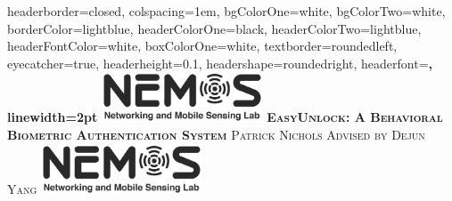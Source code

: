 \documentclass[landscape,a0paper,fontscale=0.285]{baposter} %
\begin{document}
\begin{poster}
{
headerborder=closed, %
colspacing=1em, %
bgColorOne=white, %
bgColorTwo=white, %
borderColor=lightblue, %
headerColorOne=black, %
headerColorTwo=lightblue, %
headerFontColor=white, %
boxColorOne=white, %
textborder=roundedleft, %
eyecatcher=true, %
headerheight=0.1\textheight, %
headershape=roundedright, %
headerfont=\Large\bf\textsc, %
linewidth=2pt %
}
%
{\includegraphics[height=4em]{NEMOS-logo.png}} %
{\bf\textsc{EasyUnlock: A Behavioral Biometric Authentication System}\vspace{0.5em}} %
    {\textsc{{ Patrick Nichols } \hspace{12pt} Advised by Dejun Yang}} %
{\includegraphics[height=4em]{NEMOS-logo.png}} %



\end{poster}
\end{document}
